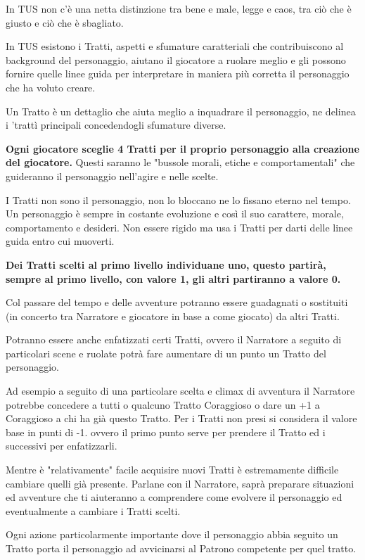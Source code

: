 \documentclass[a4paper,11pt,twoside,openany]{book}
\begin{document}
In TUS non c'è una netta distinzione tra bene e male, legge e caos, tra ciò che è giusto e ciò che è sbagliato.

In TUS esistono i Tratti, aspetti e sfumature caratteriali che contribuiscono al background del personaggio, aiutano il giocatore a ruolare meglio e gli possono fornire quelle linee guida per interpretare in maniera più corretta il personaggio che ha voluto creare.

Un Tratto è un dettaglio che aiuta meglio a inquadrare il personaggio, ne delinea i 'trattì principali concedendogli sfumature diverse.

\textbf{Ogni giocatore sceglie 4 Tratti per il proprio personaggio alla creazione del giocatore.} Questi saranno le "bussole morali, etiche e comportamentali" che guideranno il personaggio nell'agire e nelle scelte.

I Tratti non sono il personaggio, non lo bloccano ne lo fissano eterno nel tempo. Un personaggio è sempre in costante evoluzione e così il suo carattere, morale, comportamento e desideri. Non essere rigido ma usa i Tratti per darti delle linee guida entro cui muoverti.

\textbf{Dei Tratti scelti al primo livello individuane uno, questo partirà, sempre al primo livello, con valore 1, gli altri partiranno a valore 0.}

Col passare del tempo e delle avventure potranno essere guadagnati o sostituiti (in concerto tra Narratore e giocatore in base a come giocato) da altri Tratti.

Potranno essere anche enfatizzati certi Tratti, ovvero il Narratore a seguito di particolari scene e ruolate potrà fare aumentare di un punto un Tratto del personaggio.

Ad esempio a seguito di una particolare scelta e climax di avventura il Narratore potrebbe concedere a tutti o qualcuno Tratto Coraggioso o dare un +1 a Coraggioso a chi ha già questo Tratto. Per i Tratti non presi si considera il valore base in punti di -1. ovvero il primo punto serve per prendere il Tratto ed i successivi per enfatizzarli.

Mentre è "relativamente" facile acquisire nuovi Tratti è estremamente difficile cambiare quelli già presente. Parlane con il Narratore, saprà preparare situazioni ed avventure che ti aiuteranno a comprendere come evolvere il personaggio ed eventualmente a cambiare i Tratti scelti.

Ogni azione particolarmente importante dove il personaggio abbia seguito un Tratto porta il personaggio ad avvicinarsi al Patrono competente per quel tratto.
\end{document}
